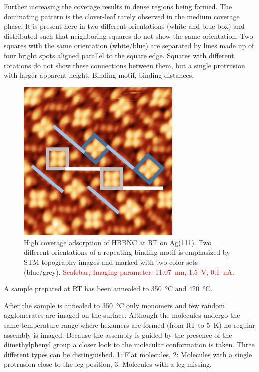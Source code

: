 Further increasing the coverage results in dense regions being formed. The dominating pattern is the clover-leaf rarely observed in the medium coverage phase. It is present here in two different orientations (white and blue box) and distributed such that neighboring squares do not show the same orientation. Two squares with the same orientation (white/blue) are separated by lines made up of four bright spots aligned parallel to the square edge. Squares with different rotations do not show these connections between them, but a single protrusion with larger apparent height.
Binding motif, binding distances.

\begin{figure}[] \centering
	\includegraphics[width=0.7\textwidth]{./images/hbbnc-ag-111-rt-high-coverage}
	\caption{High coverage adsorption of HBBNC at RT on Ag(111). Two different orientations of a repeating binding motif is emphasized by STM topography images and marked with two color sets (blue/grey). \textcolor{red}{Scalebar, Imaging parameter: \SI{11.07}{\nano \meter}, \SI{1.5}{\volt}, \SI{0.1}{\nano \ampere}}.}
	\label{}
\end{figure}

A sample prepared at RT has been annealed to \SI{350}{\celsius} and \SI{420}{\celsius}.

After the sample is annealed to \SI{350}{\celsius} only monomers and few random agglomerates are imaged on the surface. Although the molecules undergo the same temperature range where hexamers are formed (from RT to \SI{5}{\kelvin}) no regular assembly is imaged. Because the assembly is guided by the presence of the dimethylphenyl group a closer look to the molecular conformation is taken. Three different types can be distinguished. 1: Flat molecules, 2: Molecules with a single protrusion close to the leg position, 3: Molecules with a leg missing.

